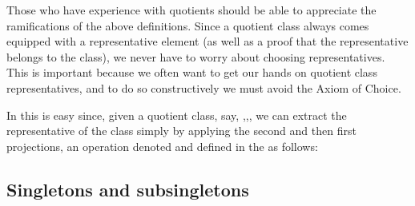 \documentclass[a4paper,USenglish,cleveref,autoref,thm-restate]{lipics-v2019}
\begin{document}
Those who have experience with quotients should be able to appreciate the ramifications of the above definitions.  Since a quotient class always comes equipped with a representative element (as well as a proof that the representative belongs to the class), we never have to worry about choosing representatives. This is important because we often want to get our hands on quotient class representatives, and to do so constructively we must avoid the Axiom of Choice.

In \agdaualib this is easy since, given a quotient class, say, \AgdaSpace{}\AgdaSymbol{=}\AgdaSpace{}\AgdaSymbol{(}\AgdaSpace{}\AgdaSpace{},\AgdaSpace{}\AgdaSpace{},\AgdaSpace{}\AgdaSpace{}\AgdaSymbol{)}, we can extract the representative  of the class simply by applying the second and then first projections, an operation denoted and defined in the \agdaualib as follows:
\begin{code}\end{code}

\subsection{Singletons and subsingletons}
\begin{code}
\>[0]\AgdaSpace{}%
\AgdaSymbol{:}\AgdaSpace{}%
\AgdaSymbol{\{}\AgdaSpace{}%
\AgdaSymbol{:}\AgdaSpace{}%
\AgdaSpace{}%
\AgdaSpace{}%
\AgdaSymbol{\}}\AgdaSpace{}%
\AgdaSpace{}%
\AgdaSpace{}%
\AgdaSpace{}%
\AgdaSpace{}%
\AgdaSpace{}%
\AgdaSpace{}%
\AgdaSpace{}%
\AgdaSpace{}%
\<%
\\
\>[0]%
\>[24]\AgdaSpace{}%
\AgdaSymbol{=}\AgdaSpace{}%
\AgdaSpace{}%
\AgdaSpace{}%
\AgdaSpace{}%
\AgdaSpace{}%
\AgdaSpace{}%
\AgdaSymbol{(}\AgdaSpace{}%
\AgdaSpace{}%
\AgdaSymbol{)}\<%
\end{code}
\end{document}
